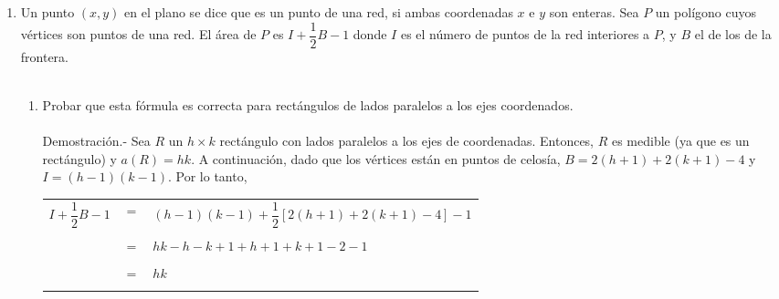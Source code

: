\begin{enumerate}[ \bfseries 1.]
	\item Un punto $(x,y)$ en el plano se dice que es un punto de una red, si ambas coordenadas $x$ e $y$ son enteras. Sea $P$ un polígono cuyos vértices son puntos de una red. El área de $P$ es $I+\dfrac{1}{2} B - 1$ donde $I$ es el número de puntos de la red interiores a $P$, y $B$ el de los de la frontera.\\\\

	    \begin{enumerate}[\bfseries (a)]

		\item Probar que esta fórmula es correcta para rectángulos de lados paralelos a los ejes coordenados.\\\\
		Demostración.-\; Sea $R$ un $h \times k$ rectángulo con lados paralelos a los ejes de coordenadas. Entonces, $R$ es medible (ya que es un rectángulo) y $a(R) = hk.$
A continuación, dado que los vértices están en puntos de celosía, $B = 2 (h + 1) + 2 (k + 1) - 4$ y $I = (h-1) (k-1)$. Por lo tanto,
		\begin{center}
		    \begin{tabular}{rcl}
		    $I+\dfrac{1}{2}B-1$ & $=$ & $(h-1)(k-1)+\dfrac{1}{2}\left[2(h+1)+2(k+1)-4\right]-1$ \\\\
		     & $=$ & $hk-h-k+1+h+1+k+1-2-1$ \\\\
		     & $=$ & $hk$ \\\\
		    \end{tabular}
		\end{center}


\end{enumerate}
\end{enumerate}
